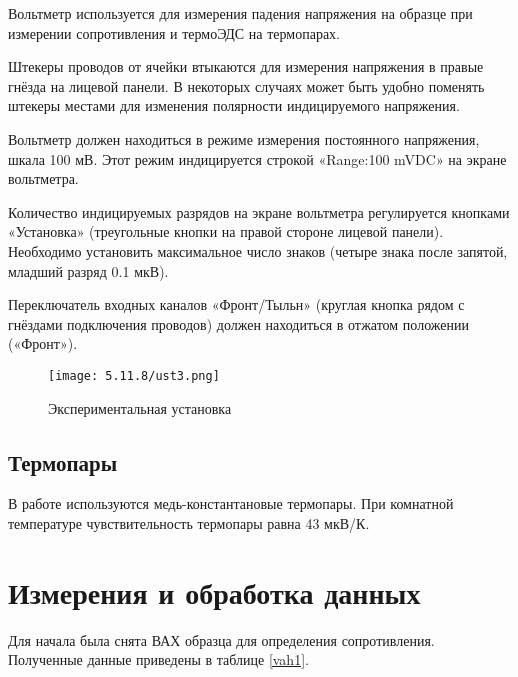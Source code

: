 \documentclass[a4paper,12pt]{article} %
\begin{document}
Вольтметр используется для измерения падения напряжения на образце при измерении сопротивления и термоЭДС на термопарах.

Штекеры проводов от ячейки втыкаются для измерения напряжения в правые гнёзда на лицевой панели. В некоторых случаях может быть удобно поменять штекеры местами для изменения полярности индицируемого напряжения.

Вольтметр должен находиться в режиме измерения постоянного напряжения, шкала 100 мВ. Этот режим индицируется строкой «Range:100 mVDC» на экране вольтметра.

Количество индицируемых разрядов на экране вольтметра регулируется кнопками «Установка» (треугольные кнопки на правой стороне лицевой панели). Необходимо установить максимальное число знаков (четыре знака после запятой, младший разряд 0.1 мкВ).

Переключатель входных каналов «Фронт/Тыльн» (круглая кнопка рядом с гнёздами подключения проводов) должен находиться в отжатом положении («Фронт»).

\begin{figure}[H]
    \centering
    \texttt{[image: 5.11.8/ust3.png]}
    \caption{Экспериментальная установка}
    \label{ust3}
\end{figure}

\subsection{Термопары}

В работе используются медь-константановые термопары. При комнатной температуре чувствительность термопары равна 43 мкВ/К.

\section{Измерения и обработка данных}

Для начала была снята ВАХ образца для определения сопротивления. Полученные данные приведены в таблице \ref{vah1}.
\end{document}
